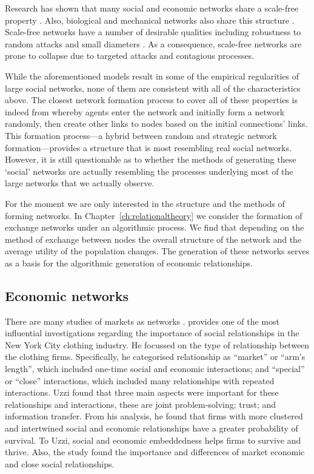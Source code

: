 Research has shown that many social and economic networks share a scale-free property \citep{Faloutsos1999, DorogovtsevMendes2003, Barabasi2009, Barabasi2012}. Also, biological and mechanical networks also share this structure \citep{Barabasi2011}. Scale-free networks have a number of desirable qualities including robustness to random attacks and small diameters \citep{AlbertJeongBarabasi1999, AlbertJeongBarabasi2000}. As a consequence, scale-free networks are prone to collapse due to targeted attacks and contagious processes.

While the aforementioned models result in some of the empirical regularities of large social networks, none of them are consistent with all of the characteristics above. The closest network formation process to cover all of these properties is indeed from \citet{JacksonRogers2007} whereby agents enter the network and initially form a network randomly, then create other links to nodes based on the initial connections' links. This formation process---a hybrid between random and strategic network formation---provides a structure that is most resembling real social networks. However, it is still questionable as to whether the methods of generating these `social' networks are actually resembling the processes underlying most of the large networks that we actually observe.

For the moment we are only interested in the structure and the methods of forming networks. In Chapter~\ref{ch:relationaltheory} we consider the formation of exchange networks under an algorithmic process. We find that depending on the method of exchange between nodes the overall structure of the network and the average utility of the population changes. The generation of these networks serves as a basis for the algorithmic generation of economic relationships.

\subsection{Economic networks}

There are many studies of markets as networks \citep{RauchCasella2001}. \citet{Uzzi1996} provides one of the most influential investigations regarding the importance of social relationships in the New York City clothing industry. He focussed on the type of relationship between the clothing firms. Specifically, he categorised relationship as ``market'' or ``arm's length'', which included one-time social and economic interactions; and ``special'' or ``close'' interactions, which included many relationships with repeated interactions. Uzzi found that three main aspects were important for these relationships and interactions, these are joint problem-solving; trust; and information transfer. From his analysis, he found that firms with more clustered and intertwined social and economic relationships have a greater probability of survival. To Uzzi, social and economic embeddedness helps firms to survive and thrive. Also, the study found the importance and differences of market economic and close social relationships.

